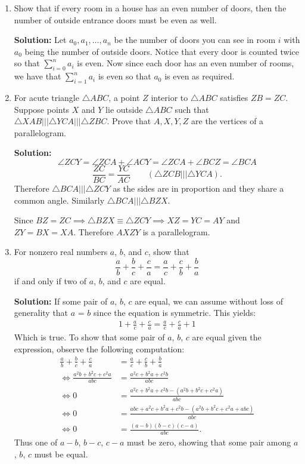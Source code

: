 \documentclass{article}
\begin{document}
\begin{enumerate}[itemsep=24pt]
\item %
Show that if every room in a house has an even number of doors, then the number of outside entrance doors must be even as well.

\textbf{Solution:}
Let $a_0, a_1, \dotsc, a_n$ be the number of doors you can see in room $i$ with $a_0$ being the number of outside doors. Notice that every door is counted twice so that $\sum_{i=0}^{n} a_i$ is even.
Now since each door has an even number of rooms, we have that $\sum_{i=1}^{n} a_i$ is even so that $a_0$ is even as required.


\item 
For acute triangle $\triangle ABC$, a point $Z$ interior to $\triangle ABC$ satisfies $ZB = ZC$.
Suppose points $X$ and $Y$ lie outside $\triangle ABC$ such that $\triangle XAB \mathrel{|||} \triangle YCA \mathrel{|||} \triangle ZBC$.
Prove that $A,X,Y,Z$ are the vertices of a parallelogram. 

\textbf{Solution:}
$$\angle ZCY = \angle ZCA + \angle ACY = \angle ZCA + \angle BCZ = \angle BCA$$
$$\frac{ZC}{BC} = \frac{YC}{AC} \qquad (\triangle ZCB \mathrel{|||} \triangle YCA).$$
Therefore $\triangle BCA \mathrel{|||} \triangle ZCY$ as the sides are in proportion and they share a common angle. Similarly $\triangle BCA \mathrel{|||} \triangle BZX$. 

Since $BZ = ZC \implies \triangle BZX \equiv \triangle ZCY \implies XZ = YC = AY$ and $ZY = BX = XA$.
Therefore $AXZY$ is a parallelogram.


\item
For nonzero real numbers $a$, $b$, and $c$, show that
\[ \frac{a}{b} +\frac{b}{c} +\frac{c}{a} = \frac{a}{c} +\frac{c}{b} +\frac{b}{a} \]
if and only if two of $a$, $b$, and $c$ are equal.

\textbf{Solution:} If some pair of $a$, $b$, $c$ are equal, we can assume without loss of generality that $a$ = $b$ since the equation is symmetric.
This yields:
\begin{align*}
    1 +\frac{a}{c} +\frac{c}{a} = \frac{a}{c} +\frac{c}{a} +1
\end{align*}
Which is true. To show that some pair of $a$, $b$, $c$ are equal given the expression, observe the following computation:
\begin{align*}
  \frac{a}{b} +\frac{b}{c} +\frac{c}{a} &= \frac{a}{c} +\frac{c}{b} +\frac{b}{a} \\
  \iff \frac{a^{2}b + b^{2}c + c^{2}a}{abc} & = \frac{a^{2}c + b^{2}a + c^{2}b}{abc}\\
  \iff 0 & = \frac{a^{2}c + b^{2}a + c^{2}b -(a^{2}b + b^{2}c + c^{2}a)}{abc} \\
  \iff 0 & = \frac{abc + a^{2}c + b^{2}a + c^{2}b - (a^{2}b + b^{2}c + c^{2}a+abc)}{abc} \\
  \iff 0 & = \frac{(a-b)(b-c)(c-a)}{abc}.
\end{align*}
Thus one of $a-b$, $b-c$, $c-a$ must be zero, showing that some pair among $a$, $b$, $c$ must be equal.

\end{enumerate}
\end{document}
